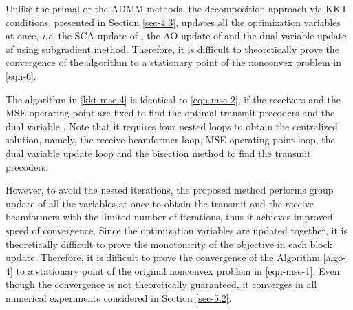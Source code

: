 		

Unlike the primal or the \ac{ADMM} methods, the decomposition approach via \ac{KKT} conditions, presented in Section \ref{sec-4.3}, updates all the optimization variables at once, \textit{i.e}, the \ac{SCA} update of , the \ac{AO} update of  and the dual variable update of \me{\alpha} using subgradient method. Therefore, it is difficult to theoretically prove the convergence of the algorithm to a stationary point of the nonconvex problem in \eqref{eqn-6}.

The algorithm in \eqref{kkt-mse-4} is identical to \eqref{eqn-mse-2}, if the receivers  and the \ac{MSE} operating point  are fixed to find the optimal transmit precoders  and the dual variable . Note that it requires four nested loops to obtain the centralized solution, namely, the receive beamformer loop, \ac{MSE} operating point loop, the dual variable update loop and the bisection method to find the transmit precoders. 

However, to avoid the nested iterations, the proposed method performs group update of all the variables at once to obtain the transmit and the receive beamformers with the limited number of iterations, thus it achieves improved speed of convergence. Since the optimization variables are updated together, it is theoretically difficult to prove the monotonicity of the objective in each block update. Therefore, it is difficult to prove the convergence of the Algorithm \ref{algo-4} to a stationary point of the original nonconvex problem in \eqref{eqn-mse-1}. Even though the convergence is not theoretically guaranteed, it converges in all numerical experiments considered in Section \ref{sec-5.2}.

